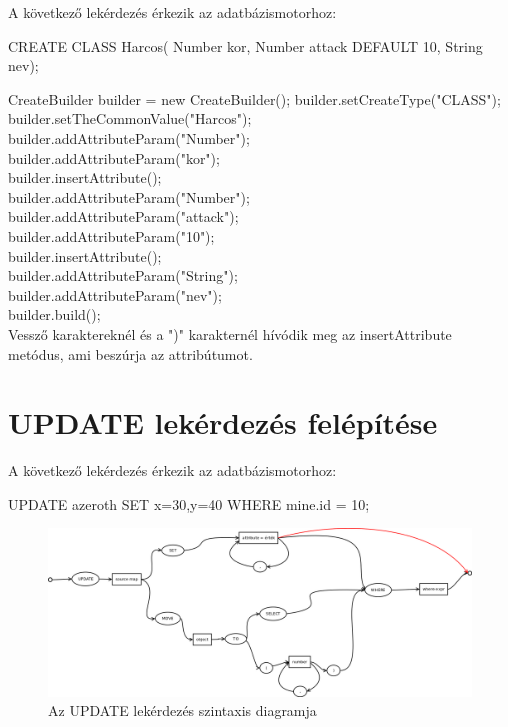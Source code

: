 A következő lekérdezés érkezik az adatbázismotorhoz:
\begin{sql}
CREATE CLASS Harcos(
Number kor,
Number attack DEFAULT 10,
String nev);
\end{sql}

CreateBuilder builder = new CreateBuilder();
builder.setCreateType("CLASS"); \\
builder.setTheCommonValue("Harcos"); \\
builder.addAttributeParam("Number"); \\
builder.addAttributeParam("kor"); \\
builder.insertAttribute(); \\
builder.addAttributeParam("Number"); \\
builder.addAttributeParam("attack"); \\
builder.addAttributeParam("10"); \\
builder.insertAttribute(); \\
builder.addAttributeParam("String"); \\
builder.addAttributeParam("nev"); \\
builder.build(); \\

Vessző karaktereknél és a ")" karakternél hívódik meg az insertAttribute metódus, ami beszúrja az attribútumot.


\section{UPDATE lekérdezés felépítése}

A következő lekérdezés érkezik az adatbázismotorhoz:
\begin{sql}
UPDATE azeroth SET x=30,y=40 WHERE mine.id = 10;
\end{sql}

\begin{figure}[htb]
	\begin{center}
		\includegraphics[scale=0.4]{images/update}
		\caption{Az UPDATE lekérdezés szintaxis diagramja}
		\label{fig:updateSytnax}
	\end{center}
\end{figure}



